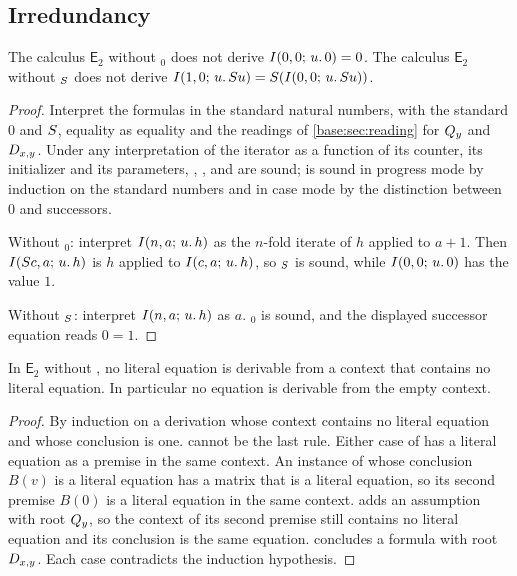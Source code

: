 \subsection{Irredundancy}

\begin{proposition}
\label{comp:prop:evalsharp}
The calculus $\mathsf{E}_2$ without $_0$ does not derive
$I(0,0;\,u.\,0)=0$. The calculus $\mathsf{E}_2$ without
$_{S}$ does not derive
$I(1,0;\,u.\,S u)=S(I(0,0;\,u.\,S u))$.
\end{proposition}

\begin{proof}
Interpret the formulas in the standard natural numbers, with the standard
$0$ and $S$, equality as equality and the readings of
\cref{base:sec:reading} for $Q_{y}$ and $D_{x,y}$. Under any interpretation
of the iterator as a function of its counter, its initializer and its
parameters, , ,  and 
are sound;  is sound in progress mode by induction on the
standard numbers and in case mode by the distinction between $0$ and
successors.

Without $_0$: interpret $I(n,a;\,u.\,h)$ as the $n$-fold
iterate of $h$ applied to $a+1$. Then $I(S c,a;\,u.\,h)$ is $h$ applied
to $I(c,a;\,u.\,h)$, so $_{S}$ is sound, while
$I(0,0;\,u.\,0)$ has the value $1$.

Without $_{S}$: interpret $I(n,a;\,u.\,h)$ as $a$.
$_0$ is sound, and the displayed successor equation reads
$0=1$.
\end{proof}

\begin{proposition}
\label{comp:prop:reflsharp}
In $\mathsf{E}_2$ without , no literal equation is derivable
from a context that contains no literal equation. In particular no equation
is derivable from the empty context.
\end{proposition}

\begin{proof}
By induction on a derivation whose context contains no literal equation and
whose conclusion is one.  cannot be the last rule. Either case
of  has a literal equation as a premise in the same context.
An instance of  whose conclusion $B(v)$ is a literal equation
has a matrix that is a literal equation, so its second premise $B(0)$ is a
literal equation in the same context.  adds an assumption with
root $Q_{y}$, so the context of its second premise still contains no literal
equation and its conclusion is the same equation.  concludes a
formula with root $D_{x,y}$. Each case contradicts the induction hypothesis.
\end{proof}

